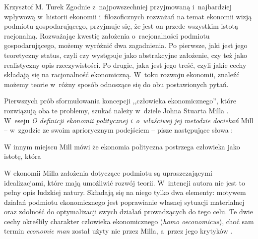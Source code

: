 \begin{artplenv}{Krzysztof M. Turek}
Zgodnie z~najpowszechniej przyjmowaną i~najbardziej wpływową w~historii ekonomii i~filozoficznych rozważań na temat
ekonomii wizją podmiotu gospodarującego, przyjmuje się, że jest on przede wszystkim istotą racjonalną. Rozważając
kwestię założenia o~racjonalności podmiotu gospodarującego, możemy wyróżnić dwa zagadnienia. Po pierwsze, jaki jest
jego teoretyczny status, czyli czy występuje jako abstrakcyjne założenie, czy też jako realistyczny opis rzeczywistości.
Po drugie, jaka jest jego treść, czyli jakie cechy składają się na racjonalność ekonomiczną. W~toku rozwoju ekonomii,
znaleźć możemy teorie w~różny sposób odnoszące się do obu postawionych pytań.

Pierwszych prób sformułowania koncepcji ,,człowieka ekonomicznego'', które rozwiązują oba te problemy, szukać
należy w~dziele Johna Stuarta Milla
\parencite[s.~222]{persky_retrospectives:_1995}.
W~eseju \textit{O definicji ekonomii
politycznej i~o~właściwej jej metodzie dociekań} Mill -- w~zgodzie ze swoim apriorycznym podejściem -- pisze następujące
słowa
\parencite[s.~101]{mill_essays_2000}:

W innym miejscu Mill
\parencite*[s.~97]{mill_essays_2000}
mówi że ekonomia polityczna postrzega człowieka jako
istotę, która


W ekonomii Milla założenia dotyczące podmiotu są upraszczającymi idealizacjami, które mają umożliwić rozwój
teorii. W~intencji autora nie jest to pełny opis ludzkiej natury. Składają się na niego tylko dwa elementy: motywem działań
podmiotu ekonomicznego jest poprawianie własnej sytuacji materialnej oraz zdolność do optymalizacji swych działań
prowadzących do tego celu. Te dwie cechy określiły charakter człowieka ekonomicznego (\textit{homo oeconomicus}), choć
sam termin \textit{economic man} został użyty nie przez Milla, a~przez jego krytyków
\parencite[s.~222]{persky_retrospectives:_1995}.


\end{artplenv}
